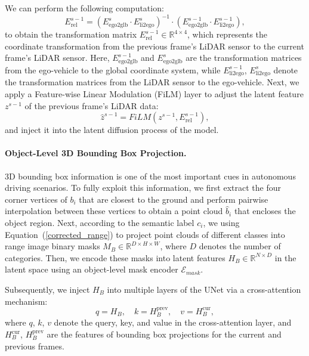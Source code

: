 We can perform the following computation:
\begin{equation}
\label{trans_metrix}
E_{\text{rel}}^{s-1} = (E_{\text{ego2glb}}^{s} \cdot E_{\text{li2ego}}^{s})^{-1} \cdot (E_{\text{ego2glb}}^{s-1} \cdot E_{\text{li2ego}}^{s-1}),
\end{equation}
to obtain the transformation matrix \( E_{\text{rel}}^{s-1} \in \mathbb{R}^{4 \times 4} \), which represents the coordinate transformation from the previous frame's LiDAR sensor to the current frame's LiDAR sensor.
Here, \( E_{\text{ego2glb}}^{s-1} \) and \( E_{\text{ego2glb}}^{s} \) are the transformation matrices from the ego-vehicle to the global coordinate system, while \( E_{\text{li2ego}}^{s-1} \), \( E_{\text{li2ego}}^{s} \) denote the transformation matrices from the LiDAR sensor to the ego-vehicle.
Next, we apply a Feature-wise Linear Modulation (FiLM) layer to adjust the latent feature \( z^{s-1} \) of the previous frame's LiDAR data:
\begin{equation}
\label{film}
\hat{z}^{s-1} = FiLM(z^{s-1}, E_{\text{rel}}^{s-1}),
\end{equation}
and inject it into the latent diffusion process of the model.

\vspace{-3mm}
\paragraph{Object-Level 3D Bounding Box Projection.}
3D bounding box information is one of the most important cues in autonomous driving scenarios.
To fully exploit this information, we first extract the four corner vertices of \( b_{i} \) that are closest to the ground and perform pairwise interpolation between these vertices to obtain a point cloud \( \hat{b}_{i} \) that encloses the object region.
Next, according to the semantic label \( c_{i} \), we using Equation~(\ref{corrected_range}) to project point clouds of different classes into range image binary masks \( M_{B} \in \mathbb{R}^{D \times H \times W} \), where \( D \) denotes the number of categories.
Then, we encode these masks into latent features \( H_{B} \in \mathbb{R}^{N \times D} \) in the latent space using an object-level mask encoder \( \mathcal{E}_{mask} \).

Subsequently, we inject \( H_{B} \) into multiple layers of the UNet via a cross-attention mechanism:
\begin{equation}
\label{cross_attention}
q = H_{B}, \quad k = H_{B}^{\text{prev}},\quad v = H_{B}^{\text{cur}},
\end{equation}
where \( q \), \( k \), \( v \) denote the query, key, and value in the cross-attention layer, and \( H_{B}^{\text{cur}} \), \( H_{B}^{\text{prev}} \) are the features of bounding box projections for the current and previous frames.

